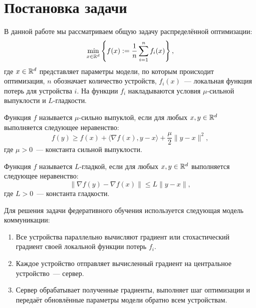 \section{Постановка задачи}

    В данной работе мы рассматриваем общую задачу распределённой оптимизации:
    \begin{equation}
        \min \limits_{x \in \mathbb{R}^d}  \left\{f(x) := \frac{1}{n} \sum \limits_{i=1}^n f_i(x) \right\}, \label{eq:problem_statement}
    \end{equation}
    где $x \in \mathbb{R}^d$ представляет параметры модели, по которым происходит оптимизация, $n$ обозначает количество устройств, $f_i(x)$~--- локальная функция потерь для устройства $i$. На функции $f_i$ накладываются условия $\mu$-сильной выпуклости и $L$-гладкости.

    \begin{definition}
        Функция $f$ называется $\mu$-сильно выпуклой, если для любых $x, y \in \mathbb{R}^d$ выполняется следующее неравенство:
        \begin{equation}
            f(y) \geq f(x) + \langle \nabla f(x), y - x \rangle + \frac{\mu}{2} \|y - x\|^2, \label{eq:strong_convexity}
        \end{equation}
        где $\mu > 0$~--- константа сильной выпуклости.
    \end{definition}

    \begin{definition}
        Функция $f$ называется $L$-гладкой, если для любых $x, y \in \mathbb{R}^d$ выполняется следующее неравенство:
        \begin{equation}
            \|\nabla f(y) - \nabla f(x)\| \leq L \|y - x\|, \label{eq:smoothness}
        \end{equation}
        где $L > 0$~--- константа гладкости.
    \end{definition}


    Для решения задачи федеративного обучения используется следующая модель коммуникации:

    \begin{enumerate}
        \item Все устройства параллельно вычисляют градиент или стохастический градиент своей локальной функции потерь $f_i$.
        \item Каждое устройство отправляет вычисленный градиент на центральное устройство~--- сервер.
        \item Сервер обрабатывает полученные градиенты, выполняет шаг оптимизации и передаёт обновлённые параметры модели обратно всем устройствам.
    \end{enumerate}

